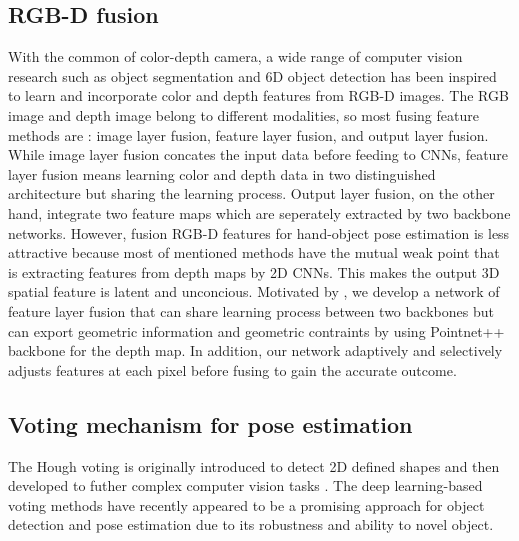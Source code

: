 \subsection{RGB-D fusion}
With the common of color-depth camera, a wide range of computer vision research such as object segmentation \cite{chen2021global, chen2020bi, park2017rdfnet, zhang2021non} and 6D object detection \cite{wang2019densefusion, tian2020robust, saadi2021optimizing} has been inspired to learn and incorporate color and depth features from RGB-D images. The RGB image and depth image belong to different modalities, so most fusing feature methods are \cite{wang2021brief}: image layer fusion, feature layer fusion, and output layer fusion. While image layer fusion concates the input data before feeding to CNNs, feature layer fusion means learning color and depth data in two distinguished architecture but sharing the learning process. Output layer fusion, on the other hand, integrate two feature maps which are seperately extracted by two backbone networks. However, fusion RGB-D features for hand-object pose estimation is less attractive because  most of mentioned methods have the mutual weak point that is extracting features from depth maps by 2D CNNs. This makes the output 3D spatial feature is latent and unconcious. Motivated by \cite{wang2019densefusion}, we develop a network of feature layer fusion that can share learning process between two backbones but can export geometric information and geometric contraints by using Pointnet++ \cite{qi2017pointnet++} backbone for the depth map. In addition, our network adaptively and selectively adjusts features at each pixel before fusing to gain the accurate outcome.

\subsection{Voting mechanism for pose estimation}
The Hough voting is originally introduced to detect 2D defined shapes \cite{hough1959machine, duda1972textordfeminineuse} and then developed to futher complex computer vision tasks \cite{silberberg1984iterative, tombari2010object}. The deep learning-based voting methods \cite{ding2019votenet, kehl2016deep, wu2021vote, hoang2022voting} have recently appeared to be a promising approach for object detection and pose estimation due to its robustness and ability to novel object. 